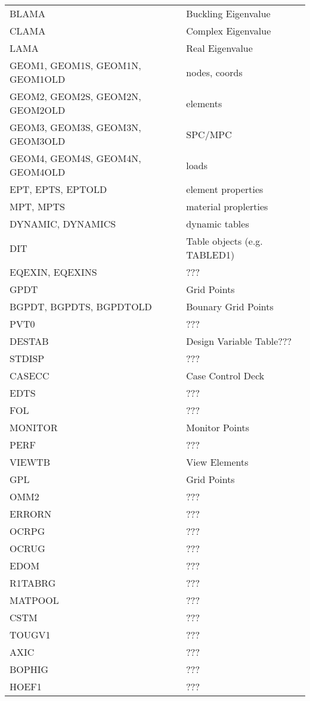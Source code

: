 \begin{tabular}{ll}
    BLAMA & Buckling Eigenvalue \\
    CLAMA & Complex Eigenvalue  \\
    LAMA  & Real Eigenvalue     \\

    GEOM1, GEOM1S, GEOM1N, GEOM1OLD & nodes, coords \\
    GEOM2, GEOM2S, GEOM2N, GEOM2OLD & elements      \\
    GEOM3, GEOM3S, GEOM3N, GEOM3OLD & SPC/MPC       \\
    GEOM4, GEOM4S, GEOM4N, GEOM4OLD & loads         \\
    EPT, EPTS, EPTOLD & element properties          \\
    MPT, MPTS         & material proplerties        \\

    DYNAMIC, DYNAMICS & dynamic tables               \\
    DIT               & Table objects (e.g. TABLED1) \\

    EQEXIN, EQEXINS & ??? \\

    GPDT                     & Grid Points         \\
    BGPDT, BGPDTS, BGPDTOLD  & Bounary Grid Points \\

    PVT0    & ???                      \\
    DESTAB  & Design Variable Table??? \\
    STDISP  & ???                      \\
    CASECC  & Case Control Deck        \\

    EDTS     & ???            \\
    FOL      & ???            \\
    MONITOR  & Monitor Points \\
    PERF     & ???            \\
    VIEWTB   & View Elements  \\

    GPL     & Grid Points \\
    OMM2    & ???         \\
    ERRORN  & ???         \\
    OCRPG   & ???         \\
    OCRUG   & ???         \\
    EDOM    & ???         \\
    R1TABRG & ???         \\
    MATPOOL & ???         \\
    CSTM    & ???         \\
    TOUGV1  & ???         \\
    AXIC    & ???         \\
    BOPHIG  & ???         \\
    HOEF1   & ???         \\



\end{tabular}
